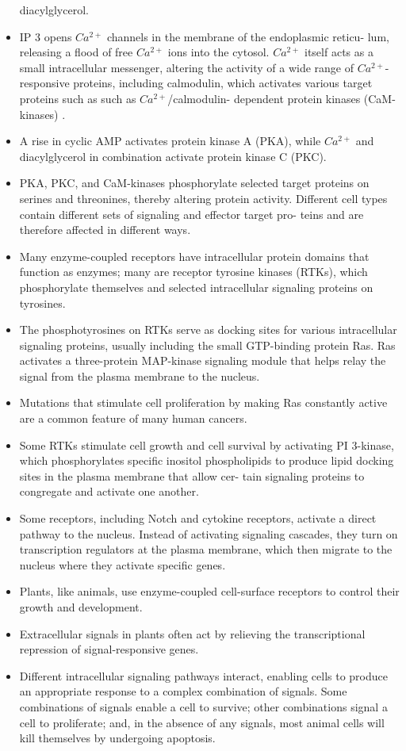 \begin{itemize}
diacylglycerol.
\item IP 3 opens $Ca^{2+}$ channels in the membrane of the endoplasmic reticu-
lum, releasing a flood of free $Ca^{2+}$ ions into the cytosol. $Ca^{2+}$ itself
acts as a small intracellular messenger, altering the activity of a
wide range of $Ca^{2+}$-responsive proteins, including calmodulin, which
activates various target proteins such as such as $Ca^{2+}$/calmodulin-
dependent protein kinases (CaM-kinases) .
\item A rise in cyclic AMP activates protein kinase A (PKA), while $Ca^{2+}$ and
diacylglycerol in combination activate protein kinase C (PKC).
\item PKA, PKC, and CaM-kinases phosphorylate selected target proteins
on serines and threonines, thereby altering protein activity. Different
cell types contain different sets of signaling and effector target pro-
teins and are therefore affected in different ways.
\item Many enzyme-coupled receptors have intracellular protein domains
that function as enzymes; many are receptor tyrosine kinases (RTKs),
which phosphorylate themselves and selected intracellular signaling
proteins on tyrosines.
\item The phosphotyrosines on RTKs serve as docking sites for various intracellular
signaling proteins, usually including the small GTP-binding
protein Ras. Ras activates a three-protein MAP-kinase signaling
module that helps relay the signal from the plasma membrane to the
nucleus.
\item Mutations that stimulate cell proliferation by making Ras constantly
active are a common feature of many human cancers.
\item Some RTKs stimulate cell growth and cell survival by activating PI
3-kinase, which phosphorylates specific inositol phospholipids to
produce lipid docking sites in the plasma membrane that allow cer-
tain signaling proteins to congregate and activate one another.
\item Some receptors, including Notch and cytokine receptors, activate
a direct pathway to the nucleus. Instead of activating signaling
cascades, they turn on transcription regulators at the plasma membrane,
which then migrate to the nucleus where they activate specific
genes.
\item Plants, like animals, use enzyme-coupled cell-surface receptors to
control their growth and development.
\item Extracellular signals in plants often act by relieving the transcriptional
repression of signal-responsive genes.
\item Different intracellular signaling pathways interact, enabling cells to
produce an appropriate response to a complex combination of signals.
Some combinations of signals enable a cell to survive; other combinations
signal a cell to proliferate; and, in the absence of any signals,
most animal cells will kill themselves by undergoing apoptosis.
\end{itemize}

